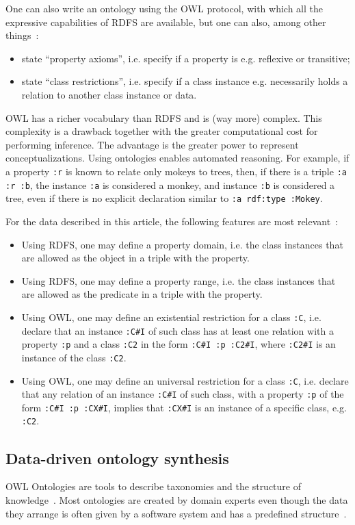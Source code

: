 \documentclass[review]{elsarticle}
\newcommand{\textttt}[1] {\texttt{\footnotesize#1}}
\begin{document}
One can also write an ontology using the OWL protocol,
with which all the expressive capabilities of RDFS are
available, but one can also, among other things~\cite{owl}:
\begin{itemize}
  \item state ``property axioms'', i.e. specify if a property is e.g. reflexive or transitive;
  \item state ``class restrictions'', i.e. specify if a class instance e.g. necessarily holds a relation to another class instance or data.
\end{itemize}
OWL has a richer vocabulary than RDFS and is (way more) complex.
This complexity is a drawback together with the greater computational cost
for performing inference.
The advantage is the greater power to represent conceptualizations.
Using ontologies enables automated reasoning.
For example, if a property \textttt{:r} is known to relate only mokeys to trees,
then, if there is a triple \textttt{:a :r :b}, the instance \textttt{:a} is considered a monkey,
and instance \textttt{:b} is considered a tree,
even if there is no explicit declaration similar
to \textttt{:a rdf:type :Mokey}.

For the data described in this article, the following features are most relevant~\cite{rdfs,owl}:
\begin{itemize}
  \item Using RDFS, one may define a property domain, i.e. the class instances that are allowed as the object in a triple with the property.
  \item Using RDFS, one may define a property range, i.e. the class instances that are allowed as the predicate in a triple with the property.
  \item Using OWL, one may define an existential restriction for a class \textttt{:C},
    i.e. declare that an instance \textttt{:C\#I} of such class has at least one relation with a property \textttt{:p} and a class \textttt{:C2} in the form
    \textttt{:C\#I :p :C2\#I}, where \textttt{:C2\#I} is an instance of the class \textttt{:C2}.
  \item Using OWL, one may define an universal restriction for a class \textttt{:C},
    i.e. declare that any relation of an instance \textttt{:C\#I} of such class, with a property \textttt{:p} of the form \textttt{:C\#I :p :CX\#I},
    implies that \textttt{:CX\#I} is an instance of a specific class, e.g. \textttt{:C2}.
\end{itemize}


\subsection{Data-driven ontology synthesis}\label{ont}
OWL Ontologies are tools to describe taxonomies and the
structure of knowledge~\cite{owl1}.
Most ontologies are created by domain experts even though the data they
arrange is often given by a software system and has a predefined
structure~\cite{owl2}. 
\end{document}
